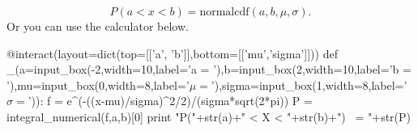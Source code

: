 \documentclass[10pt,]{book}
\numberwithin{equation}{section}
\newcommand{\lt}{<}
\begin{document}
\begin{equation*}
P( a \lt x \lt b ) = \text{normalcdf}(a,b,\mu, \sigma).
\end{equation*}
Or you can use the calculator below.%
\par
\hypertarget{p-1044}{}%
\leavevmode%
\begin{sageinput}
@interact(layout=dict(top=[['a', 'b']],bottom=[['mu','sigma']]))
def _(a=input_box(-2,width=10,label='a = '),b=input_box(2,width=10,label='b = '),mu=input_box(0,width=8,label='$\mu = $'),sigma=input_box(1,width=8,label='$\sigma = $')):
    f = e^(-((x-mu)/sigma)^2/2)/(sigma*sqrt(2*pi))
    P = integral_numerical(f,a,b)[0]
    print "P("+str(a)+" < X < "+str(b)+") ~= "+str(P)
\end{sageinput}
%
%
%
\typeout{************************************************}
\typeout{************************************************}
%
\end{document}
